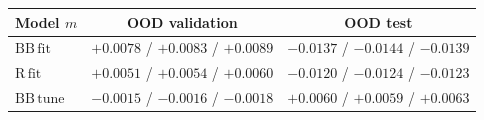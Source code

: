 \begin{tabular}{lcc}
\toprule
Model $m$ & OOD validation & OOD test \\
\midrule
$\mathrm{BB\,fit}$ & $+0.0078$ / $+0.0083$ / $+0.0089$ & $\minus0.0137$ / $\minus0.0144$ / $\minus0.0139$ \\
$\mathrm{R\,fit}$ & $+0.0051$ / $+0.0054$ / $+0.0060$ & $\minus0.0120$ / $\minus0.0124$ / $\minus0.0123$ \\
$\mathrm{BB\,tune}$ & $\minus0.0015$ / $\minus0.0016$ / $\minus0.0018$ & $+0.0060$ / $+0.0059$ / $+0.0063$ \\
\bottomrule
\end{tabular}
